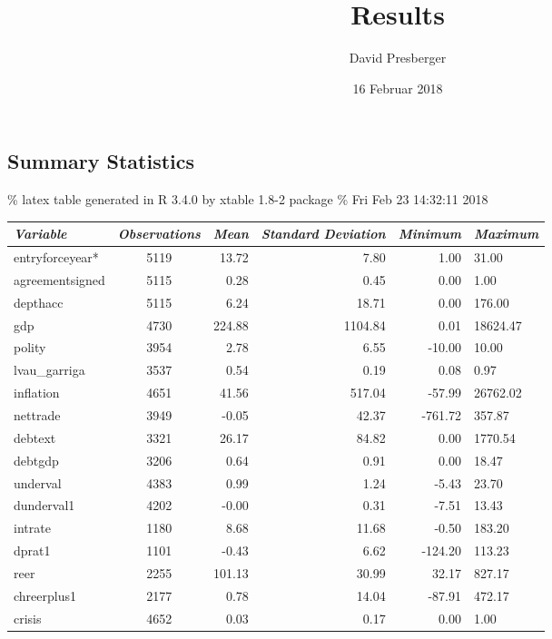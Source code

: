 \documentclass[]{article}
\title{Results}
\author{David Presberger}
\date{16 Februar 2018}
\begin{document}
\maketitle

\subsection{Summary Statistics}\label{summary-statistics}

\% latex table generated in R 3.4.0 by xtable 1.8-2 package \% Fri Feb
23 14:32:11 2018

\begin{table}[ht]
\centering
\begin{tabular}{lcrrrl}
 {\emph{Variable}} & {\emph{Observations}} & {\emph{Mean}} & {\emph{Standard Deviation}} & {\emph{Minimum}} & {\emph{Maximum}} \\ 
  \hline
entryforceyear* & 5119 & 13.72 & 7.80 & 1.00 & 31.00 \\ 
  agreementsigned & 5115 & 0.28 & 0.45 & 0.00 & 1.00 \\ 
  depthacc & 5115 & 6.24 & 18.71 & 0.00 & 176.00 \\ 
  gdp & 4730 & 224.88 & 1104.84 & 0.01 & 18624.47 \\ 
  polity & 3954 & 2.78 & 6.55 & -10.00 & 10.00 \\ 
  lvau\_garriga & 3537 & 0.54 & 0.19 & 0.08 & 0.97 \\ 
  inflation & 4651 & 41.56 & 517.04 & -57.99 & 26762.02 \\ 
  nettrade & 3949 & -0.05 & 42.37 & -761.72 & 357.87 \\ 
  debtext & 3321 & 26.17 & 84.82 & 0.00 & 1770.54 \\ 
  debtgdp & 3206 & 0.64 & 0.91 & 0.00 & 18.47 \\ 
  underval & 4383 & 0.99 & 1.24 & -5.43 & 23.70 \\ 
  dunderval1 & 4202 & -0.00 & 0.31 & -7.51 & 13.43 \\ 
  intrate & 1180 & 8.68 & 11.68 & -0.50 & 183.20 \\ 
  dprat1 & 1101 & -0.43 & 6.62 & -124.20 & 113.23 \\ 
  reer & 2255 & 101.13 & 30.99 & 32.17 & 827.17 \\ 
  chreerplus1 & 2177 & 0.78 & 14.04 & -87.91 & 472.17 \\ 
  crisis & 4652 & 0.03 & 0.17 & 0.00 & 1.00 \\ 
   \hline
\end{tabular}
\end{table}
\end{document}
